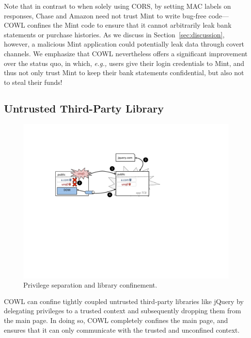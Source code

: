 Note that in contrast to when solely using CORS, by setting MAC labels
on responses, Chase and Amazon need not trust Mint to write bug-free
code---COWL confines the Mint code to ensure that it cannot
arbitrarily leak bank statements or purchase histories. As we discuss
in Section~\ref{sec:discussion}, however, a malicious Mint application
could potentially leak data through covert channels.  We emphasize
that COWL nevertheless offers a significant improvement over the
status quo, in which, \emph{e.g.,} users give their login credentials
to Mint, and thus not only trust Mint to keep their bank statements
confidential, but also not to steal their funds!

\subsection{Untrusted Third-Party Library}
\label{sec:apps-third-party}

\begin{figure}
\centerline{\includegraphics[width=\columnwidth]{jquery}}
\caption{\label{fig:jquery} Privilege separation and library
confinement.}
\end{figure}

COWL can confine tightly coupled untrusted third-party libraries like
jQuery by delegating privileges to a trusted context and subsequently
dropping them from the main page. In doing so, COWL completely
confines the main page, and ensures that it can only communicate with
the trusted and unconfined context.

